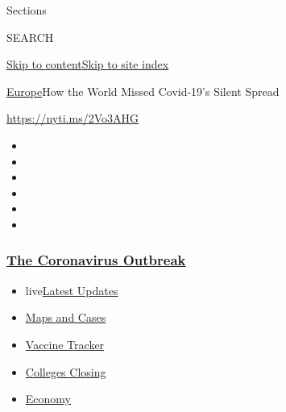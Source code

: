Sections

SEARCH

\protect\hyperlink{site-content}{Skip to
content}\protect\hyperlink{site-index}{Skip to site index}

\href{/section/world/europe}{Europe}\textbar{}How the World Missed
Covid-19's Silent Spread

\url{https://nyti.ms/2Vo3AHG}

\begin{itemize}
\item
\item
\item
\item
\item
\item
\end{itemize}

\hypertarget{the-coronavirus-outbreak}{%
\subsubsection{\texorpdfstring{\href{https://www.nytimes3xbfgragh.onion/news-event/coronavirus?name=styln-coronavirus-national\&region=TOP_BANNER\&variant=undefined\&block=storyline_menu_recirc\&action=click\&pgtype=Article\&impression_id=9b168890-e39c-11ea-a3fc-61e873d18389}{The
Coronavirus
Outbreak}}{The Coronavirus Outbreak}}\label{the-coronavirus-outbreak}}

\begin{itemize}
\tightlist
\item
  live\href{https://www.nytimes3xbfgragh.onion/2020/08/21/world/covid-19-coronavirus.html?name=styln-coronavirus-national\&region=TOP_BANNER\&variant=undefined\&block=storyline_menu_recirc\&action=click\&pgtype=Article\&impression_id=9b168891-e39c-11ea-a3fc-61e873d18389}{Latest
  Updates}
\item
  \href{https://www.nytimes3xbfgragh.onion/interactive/2020/us/coronavirus-us-cases.html?name=styln-coronavirus-national\&region=TOP_BANNER\&variant=undefined\&block=storyline_menu_recirc\&action=click\&pgtype=Article\&impression_id=9b168892-e39c-11ea-a3fc-61e873d18389}{Maps
  and Cases}
\item
  \href{https://www.nytimes3xbfgragh.onion/interactive/2020/science/coronavirus-vaccine-tracker.html?name=styln-coronavirus-national\&region=TOP_BANNER\&variant=undefined\&block=storyline_menu_recirc\&action=click\&pgtype=Article\&impression_id=9b168893-e39c-11ea-a3fc-61e873d18389}{Vaccine
  Tracker}
\item
  \href{https://www.nytimes3xbfgragh.onion/2020/08/19/us/colleges-closing-covid.html?name=styln-coronavirus-national\&region=TOP_BANNER\&variant=undefined\&block=storyline_menu_recirc\&action=click\&pgtype=Article\&impression_id=9b168894-e39c-11ea-a3fc-61e873d18389}{Colleges
  Closing}
\item
  \href{https://www.nytimes3xbfgragh.onion/live/2020/08/20/business/stock-market-today-coronavirus?name=styln-coronavirus-national\&region=TOP_BANNER\&variant=undefined\&block=storyline_menu_recirc\&action=click\&pgtype=Article\&impression_id=9b16afa0-e39c-11ea-a3fc-61e873d18389}{Economy}
\end{itemize}

